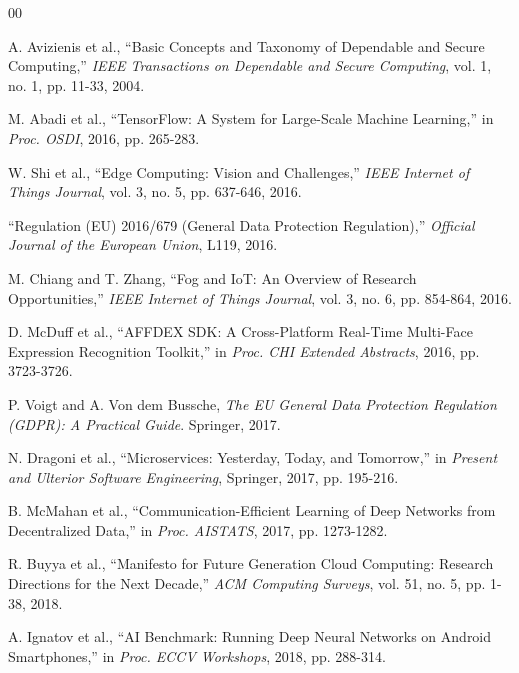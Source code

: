 \documentclass[conference]{IEEEtran}
\begin{document}
\begin{thebibliography}{00}

 A. Avizienis et al., ``Basic Concepts and Taxonomy of Dependable and Secure Computing,'' \textit{IEEE Transactions on Dependable and Secure Computing}, vol. 1, no. 1, pp. 11-33, 2004.


 M. Abadi et al., ``TensorFlow: A System for Large-Scale Machine Learning,'' in \textit{Proc. OSDI}, 2016, pp. 265-283.

 W. Shi et al., ``Edge Computing: Vision and Challenges,'' \textit{IEEE Internet of Things Journal}, vol. 3, no. 5, pp. 637-646, 2016.

 ``Regulation (EU) 2016/679 (General Data Protection Regulation),'' \textit{Official Journal of the European Union}, L119, 2016.

 M. Chiang and T. Zhang, ``Fog and IoT: An Overview of Research Opportunities,'' \textit{IEEE Internet of Things Journal}, vol. 3, no. 6, pp. 854-864, 2016.

 D. McDuff et al., ``AFFDEX SDK: A Cross-Platform Real-Time Multi-Face Expression Recognition Toolkit,'' in \textit{Proc. CHI Extended Abstracts}, 2016, pp. 3723-3726.


 P. Voigt and A. Von dem Bussche, \textit{The EU General Data Protection Regulation (GDPR): A Practical Guide}. Springer, 2017.


 N. Dragoni et al., ``Microservices: Yesterday, Today, and Tomorrow,'' in \textit{Present and Ulterior Software Engineering}, Springer, 2017, pp. 195-216.

 B. McMahan et al., ``Communication-Efficient Learning of Deep Networks from Decentralized Data,'' in \textit{Proc. AISTATS}, 2017, pp. 1273-1282.


 R. Buyya et al., ``Manifesto for Future Generation Cloud Computing: Research Directions for the Next Decade,'' \textit{ACM Computing Surveys}, vol. 51, no. 5, pp. 1-38, 2018.


 A. Ignatov et al., ``AI Benchmark: Running Deep Neural Networks on Android Smartphones,'' in \textit{Proc. ECCV Workshops}, 2018, pp. 288-314.


\end{thebibliography}
\end{document}
